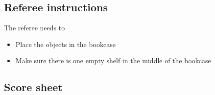 \subsection{Referee instructions}

The referee needs to
\begin{itemize}
\item Place the objects in the bookcase
\item Make sure there is one empty shelf in the middle of the bookcase
\end{itemize}

\subsection{Score sheet}


